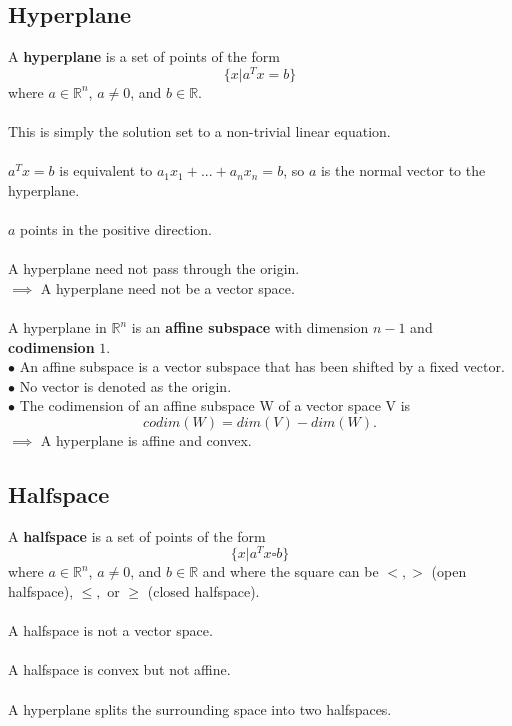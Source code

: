 \documentclass[]{article}
\begin{document}
\subsection*{Hyperplane}
A \textbf{hyperplane} is a set of points of the form $$\{x|a^{T} x = b\}$$ where $a \in \mathbb{R}^{n}$, $a \neq 0$, and $b \in \mathbb{R}$. \\\\
This is simply the solution set to a non-trivial linear equation. \\\\
$a^{T} x = b$ is equivalent to $a_{1} x_{1} + ... + a_{n} x_{n} = b$, so $a$ is the normal vector to the hyperplane. \\\\
$a$ points in the positive direction. \\\\
A hyperplane need not pass through the origin. \\ $\implies$ A hyperplane need not be a vector space. \\\\
A hyperplane in $\mathbb{R}^n$ is an \textbf{affine subspace} with dimension $n-1$ and \textbf{codimension} $1$.
\\
$\bullet$ An affine subspace is a vector subspace that has been shifted by a fixed vector.
\\
$\bullet$ No vector is denoted as the origin.
\\
$\bullet$ The codimension of an affine subspace W of a vector space V is $$codim(W)=dim(V)-dim(W).$$
$\implies$ A hyperplane is affine and convex. \\

\subsection*{Halfspace}
A \textbf{halfspace} is a set of points of the form $$\{x|a^{T} x \square b \}$$
where $a \in \mathbb{R}^{n}$, $a \neq 0$, and $b \in \mathbb{R}$ and where the square can be $<, >$ (open halfspace), $\leq,$ or $\geq$ (closed halfspace). \\\\
A halfspace is not a vector space. \\\\
A halfspace is convex but not affine. \\\\
A hyperplane splits the surrounding space into two halfspaces. \\
\end{document}
